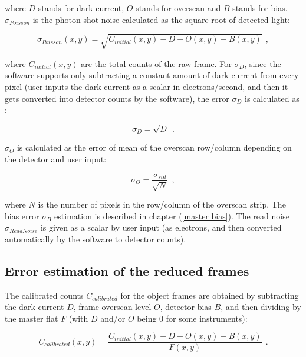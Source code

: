 \documentclass{article}
\begin{document}
\noindent where $D$ stands for dark current, $O$ stands for overscan and $B$ stands for bias. $\sigma_{Poisson}$ is the photon shot noise calculated as the square root of detected light\cite[p. 45]{handbook}:

\begin{equation}
    \sigma_{Poisson}(x,y) = \sqrt{C_{initial}(x,y) - D - O(x,y) - B(x,y)} \ \ ,
\end{equation}

\noindent where $C_{initial}(x,y)$ are the total counts of the raw frame. For $\sigma_{D}$, since the software supports only subtracting a constant amount of dark current from every pixel (user inputs the dark current as a scalar in electrons/second, and then it gets converted into detector counts by the software), the error $\sigma_{D}$ is calculated as \cite[p. 45]{handbook}:

\begin{equation}
    \sigma_{D} = \sqrt{D} \ \ .
\end{equation}


\noindent $\sigma_{O}$ is calculated as the error of mean of the overscan row/column depending on the detector and user input:

\begin{equation}
    \sigma_{O} = \frac{\sigma_{std}}{\sqrt{N}} \ \ , 
\end{equation}

\noindent where $N$ is the number of pixels in the row/column of the overscan strip. The bias error $\sigma_{B}$ estimation is described in chapter (\ref{master bias}). The read noise $\sigma_{ReadNoise}$ is given as a scalar by user input (as electrons, and then converted automatically by the software to detector counts).

\subsection{Error estimation of the reduced frames}

The calibrated counts $C_{calibrated}$ for the object frames are obtained by subtracting the dark current $D$, frame overscan level $O$, detector bias $B$, and then dividing by the master flat $F$ (with $D$ and/or $O$ being 0 for some instruments):

\begin{equation}
    C_{calibrated}(x,y) = \frac{C_{initial}(x,y) - D - O(x,y) - B(x,y)}{F(x,y)} \ \ .
\end{equation}
\end{document}

